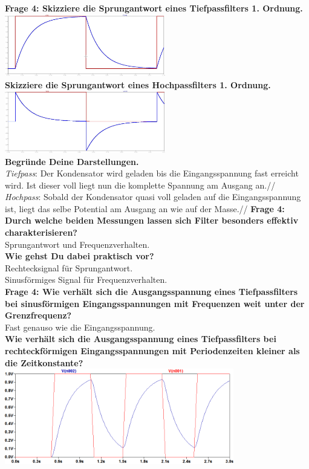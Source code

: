 \documentclass[11pt,a4paper]{scrartcl}
\begin{document}
\textbf{Frage 4: Skizziere die Sprungantwort eines Tiefpassfilters 1. Ordnung.}\\
\includegraphics[width=7cm]{sprung_tiefpass.jpg}\\
\textbf{Skizziere die Sprungantwort eines Hochpassfilters 1. Ordnung.}\\
\includegraphics[width=7cm]{sprung_hochpass.jpg}\\
\textbf{Begründe Deine Darstellungen.}\\
\textit{Tiefpass}: Der Kondensator wird geladen bis die Eingangsspannung fast erreicht wird. Ist dieser voll liegt nun die komplette Spannung am Ausgang an.//
\textit{Hochpass}: Sobald der Kondensator quasi voll geladen auf die Eingangsspannung ist, liegt das selbe Potential am Ausgang an wie auf der Masse.//
\textbf{Frage 4: Durch welche beiden Messungen lassen sich Filter besonders effektiv charakterisieren?}\\
Sprungantwort und Frequenzverhalten.\\
\textbf{Wie gehst Du dabei praktisch vor?}\\
Rechtecksignal für Sprungantwort.\\
Sinusförmiges Signal für Frequenzverhalten.\\
\textbf{Frage 4: Wie verhält sich die Ausgangsspannung eines Tiefpassfilters bei sinusförmigen Eingangsspannungen mit Frequenzen weit unter der Grenzfrequenz?}\\
Fast genauso wie die Eingangsspannung.\\
\newpage
\textbf{Wie verhält sich die \textcolor[rgb]{0,0,1}{Ausgangsspannung} eines Tiefpassfilters bei \textcolor[rgb]{1,0,0}{rechteckförmigen Eingangsspannungen} mit Periodenzeiten kleiner als die Zeitkonstante?}\\
\includegraphics[width=10cm]{TP_Rechteck.png}\\
\end{document}
